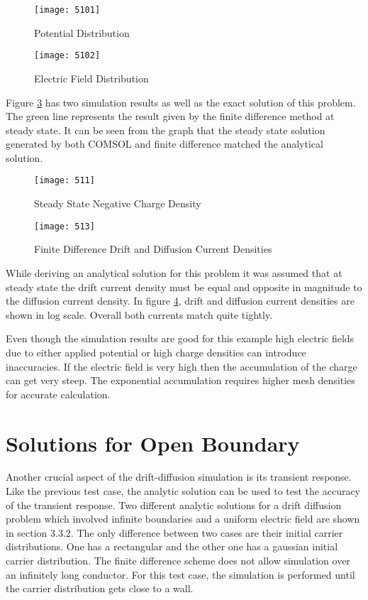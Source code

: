 \begin{doublespace}
\begin{figure}
\centering
\texttt{[image: 5101]}
\caption{Potential Distribution} 
\label{5pot}
\end{figure}

\begin{figure}
\centering
\texttt{[image: 5102]}
\caption{Electric Field Distribution} 
\label{5E}
\end{figure}

\clearpage

Figure  \ref{5ss} has two simulation results as well as the exact solution of this problem. The green line represents the result given by the finite difference method at steady state. It can be seen from the graph that the steady state solution generated by both COMSOL and finite difference matched the analytical solution.

\begin{figure}
\centering
\texttt{[image: 511]}
\caption{Steady State Negative Charge Density} 
\label{5ss}
\end{figure}

\begin{figure}[!htp]
\centering
\texttt{[image: 513]}
\caption{Finite Difference Drift and Diffusion Current Densities}
 \label{5curdens}
\end{figure}

While deriving an analytical solution for this problem it was assumed that at steady state the drift current density must be equal and opposite in magnitude to the diffusion current density. In figure \ref{5curdens}, drift and diffusion current densities are shown in log scale. Overall both currents match quite tightly.

Even though the simulation results are good for this example high electric fields due to either applied potential or high charge densities can introduce inaccuracies. If the electric field is very high then the accumulation of the charge can get very steep. The exponential accumulation requires higher mesh densities for accurate calculation.

\clearpage
\section{Solutions for Open Boundary}
Another crucial aspect of the drift-diffusion simulation is its transient response. Like the previous test case, the analytic solution can be used to test the accuracy of the transient response. Two different analytic solutions for a  drift diffusion problem which involved infinite boundaries and a uniform electric field are shown in section 3.3.2. The only difference between two cases are their initial carrier distributions. One has a rectangular and the other one has a gaussian initial carrier distribution. The finite difference scheme does not allow simulation over an infinitely long conductor. For this test case, the simulation is performed until the carrier distribution gets close to a wall.   


\end{doublespace}
